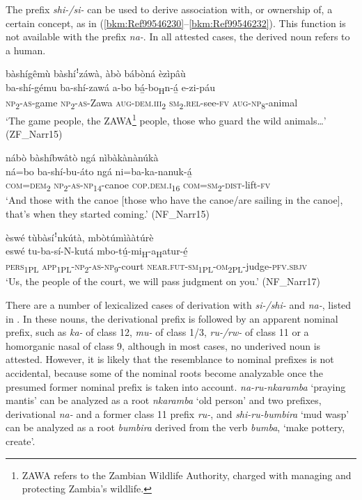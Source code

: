 The prefix \textit{shi-/si-} can be used to derive association with, or ownership of, a certain concept, as in (\ref{bkm:Ref99546230}--\ref{bkm:Ref99546232}). This function is not available with the prefix \textit{na-}. In all attested cases, the derived noun refers to a human.

\ea
\label{bkm:Ref99546230}
bàshígêmù bàshíꜝzáwà, àbò bábòná èzìpâù\\
\gll ba-shí-gému  ba-shí-zawá    a-bo    bá̲-bo\textsubscript{H}n-á̲    e-zi-páu\\
\textsc{np}\textsubscript{2}-\textsc{as}-game  \textsc{np}\textsubscript{2}-\textsc{as}-Zawa  \textsc{aug}-\textsc{dem}.\textsc{iii}\textsubscript{2}  \textsc{sm}\textsubscript{2}.\textsc{rel}-see-\textsc{fv}  \textsc{aug}-\textsc{np}\-\textsubscript{8}-animal\\
\glt ‘The game people, the ZAWA\footnote{ZAWA refers to the Zambian Wildlife Authority, charged with managing and protecting Zambia’s wildlife.}  people, those who guard the wild animals…’ (ZF\_Narr15)
\z

\ea
nábò bàshíbwâtò ngá nìbàkànànúkà\\
\gll ná=bo    ba-shí-bu-áto  ngá    ni=ba-ka-nanuk-á̲\\
\textsc{com}=\textsc{dem}\textsubscript{2}  \textsc{np}\textsubscript{2}-\textsc{as}-\textsc{np}\textsubscript{14}-canoe  \textsc{cop}.\textsc{dem}.\textsc{i}\textsubscript{16}  \textsc{com}=\textsc{sm}\textsubscript{2}-\textsc{dist}-lift-\textsc{fv}\\
\glt ‘And those with the canoe [those who have the canoe/are sailing in the canoe], that’s when they started coming.’ (NF\_Narr15)
\z

\ea
\label{bkm:Ref99546232}
èswé tùbàsíꜝnkútà, mbòtúmìààtúrè\\
\gll eswé    tu-ba-sí-N-kutá    mbo-tú̲-mi\textsubscript{H}-a\textsubscript{H}atur-é̲\\
\textsc{pers}\textsubscript{1PL}  \textsc{app}\textsubscript{1PL}-\textsc{np}\textsubscript{2}-\textsc{as}-\textsc{np}\textsubscript{9}-court   \textsc{near}.\textsc{fut}-\textsc{sm}\-\textsubscript{1PL}-\textsc{om}\textsubscript{2PL}-judge-\textsc{pfv}.\textsc{sbjv}\\
\glt ‘Us, the people of the court, we will pass judgment on you.’ (NF\_Narr17)
\z

There are a number of lexicalized cases of derivation with \textit{si-/shi-} and \textit{na-}, listed in . In these nouns, the derivational prefix is followed by an apparent nominal prefix, such as \textit{ka-} of class 12, \textit{mu-} of class 1/3, \textit{ru-/rw-} of class 11 or a homorganic nasal of class 9, although in most cases, no underived noun is attested. However, it is likely that the resemblance to nominal prefixes is not accidental, because some of the nominal roots become analyzable once the presumed former nominal prefix is taken into account. \textit{na-ru-nkaramba} ‘praying mantis’ can be analyzed as a root \textit{nkaramba} ‘old person’ and two prefixes, derivational \textit{na-} and a former class 11 prefix \textit{ru-}, and \textit{shi-ru-bumbira} ‘mud wasp’ can be analyzed as a root \textit{bumbira} derived from the verb \textit{bumba}, ‘make pottery, create’.

